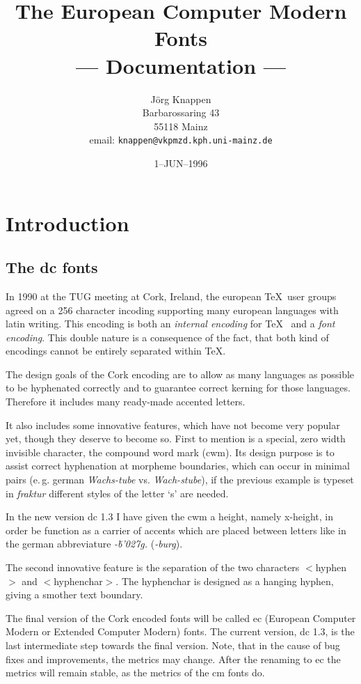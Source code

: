 \documentclass{article}
\title{The European Computer Modern Fonts\\
       --- Documentation ---}
\author{J\"org Knappen\\
       Barbarossaring 43\\
       55118 Mainz\\
       email: \texttt{knappen@vkpmzd.kph.uni-mainz.de}}
\date{1--JUN--1996}
\renewcommand{\-}{\discretionary{\char'0177 }{}{}}
\newcommand{\cwm}{\char'027}
\begin{document}
\maketitle
\section{Introduction}
\subsection{The \textsf{dc} fonts}
In 1990 at the TUG meeting at Cork, Ireland, the european \TeX\ user groups 
agreed on a 256 character incoding supporting many european languages with 
latin writing. This encoding is both an \emph{internal encoding} for \TeX\ %
and a \emph{font encoding}. This double nature is a consequence of the fact, 
that both kind of encodings cannot be entirely separated within \TeX.

The design goals of the Cork encoding are to allow as many languages as 
possible to be hyphenated correctly and to guarantee correct kerning for 
those languages. Therefore it includes many ready-made accented letters.

It also includes some innovative features, which have not become very 
popular yet, though they deserve to become so. First to mention is a 
special, zero width invisible character, the compound word mark (cwm). 
Its design purpose is to assist correct hyphenation at morpheme boundaries,
which can occur in minimal pairs (e.\,g. german \emph{Wachs-tube} vs. 
\emph{Wach-stube}), if the previous example is typeset in \emph{fraktur}
different styles of the letter `s' are needed.

In the new version dc 1.3 I have given the cwm a height, namely x-height, 
in order be function as a carrier of accents which are placed
between letters like in the german abbreviature \emph{-b\u\cwm g.} 
(\emph{-burg}).

The second innovative feature is the separation of the two characters 
$<$hyphen$>$ and  $<$hyphenchar$>$. The hyphenchar is designed as a 
hanging hyphen, giving a smother text boundary.

The final version of the Cork encoded fonts will be called \textsf{ec} 
(European Computer Modern or Extended Computer Modern) fonts. The current
version, \textsf{dc 1.3}, is the last  intermediate step towards the 
final version. Note, that in the cause of bug fixes and improvements, the 
metrics may change. After the renaming to \textsf{ec} the metrics will 
remain stable, as the metrics of the \textsf{cm} fonts do.
\end{document}
